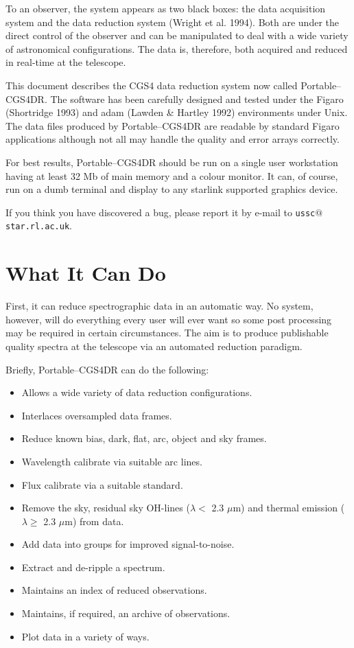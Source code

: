 \documentclass[a4paper]{book}
\renewcommand{\_}{{\tt\char'137}}
\begin{document}
To an observer, the system appears as two black boxes: the data
acquisition system and the data reduction system (Wright et al. 1994).
Both are under the direct control of the observer and can be
manipulated to deal with a wide variety of astronomical configurations.
The data is, therefore, both acquired and reduced in real-time at the
telescope.

This document describes the CGS4 data reduction system now called
Portable--CGS4DR. The software has been carefully designed and tested
under the Figaro (Shortridge 1993) and {\sc adam} (Lawden \& Hartley 1992)
environments under Unix.  The data files produced by Portable--CGS4DR
are readable by standard Figaro applications although not all may
handle the quality and error arrays correctly.

For best results, Portable--CGS4DR should be run on a single user
workstation having at least 32 Mb of main memory and a colour monitor.
It can, of course, run on a dumb terminal and display to any {\sc
starlink} supported graphics device.

If you think you have discovered a bug, please report it by e-mail to
{\tt ussc$@$star.rl.ac.uk}.

\section{What It Can Do}
First, it can reduce spectrographic data in an automatic way.  No
system, however, will do everything every user will ever want so some
post processing may be required in certain circumstances. The aim is to
produce publishable quality spectra at the telescope via an automated
reduction paradigm.

Briefly, Portable--CGS4DR can do the following:

\begin{itemize}
\item Allows a wide variety of data reduction configurations.
\item Interlaces oversampled data frames.
\item Reduce known {\sc bias}, {\sc dark}, {\sc flat}, {\sc arc}, {\sc object}
and {\sc sky} frames.
\item Wavelength calibrate via suitable {\sc arc} lines.
\item Flux calibrate via a suitable {\sc standard}.
\item Remove the {\sc sky}, residual sky OH-lines ($\lambda <$ 2.3 $\mu$m)
  and thermal emission ($\lambda \geq$ 2.3 $\mu$m) from data.
\item Add data into groups for improved signal-to-noise.
\item Extract and de-ripple a spectrum.
\item Maintains an index of reduced observations.
\item Maintains, if required, an archive of observations.
\item Plot data in a variety of ways.
\end{itemize}
\end{document}

